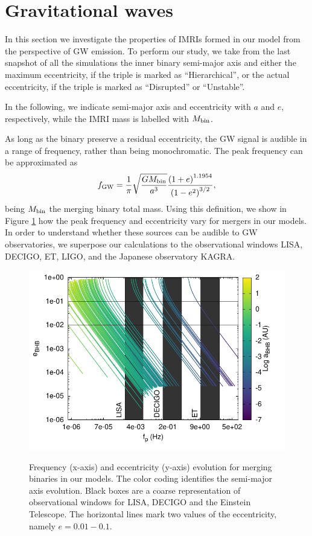 \documentclass[twocolumn]{aastex62}
\newcommand{\gw}{{\rm GW}}
\begin{document}
\section{Gravitational waves}

In this section we investigate the properties of IMRIs formed in our model from the perspective of GW emission. To perform our study, we take from the last snapshot of all the simulations the inner binary semi-major axis and either the maximum eccentricity, if the triple is marked as ``Hierarchical'', or the actual eccentricity, if the triple is marked as ``Disrupted'' or ``Unstable''.

In the following, we indicate semi-major axis and eccentricity with $a$ and $e$, respectively, while the IMRI mass is labelled with $M_{\rm bin}$.

As long as the binary preserve a residual eccentricity, the GW signal is audible in a range of frequency, rather than being monochromatic. The peak frequency can be approximated as \citep{wen03, antonini12}
\begin{equation}
f_\gw = \frac{1}{\pi}\sqrt{\frac{GM_{\rm bin}}{a^3}}\frac{\left(1+e\right)^{1.1954}}{\left(1-e^2\right)^{3/2}},
\end{equation}  
being $M_{\rm bin}$ the merging binary total mass. Using this definition, we show in Figure \ref{F10} how the peak frequency and eccentricity vary for mergers in our models. In order to understand whether these sources can be audible to GW observatories, we superpose our calculations to the observational windows LISA, DECIGO, ET, LIGO, and the Japanese observatory KAGRA.

\begin{figure}
\centering
\includegraphics[width=\columnwidth]{freq_evo}\\
\caption{Frequency (x-axis) and eccentricity (y-axis) evolution for merging binaries in our models. The color coding identifies the semi-major axis evolution. Black boxes are a coarse representation of observational windows for LISA, DECIGO and the Einstein Telescope. The horizontal lines mark two values of the eccentricity, namely $e=0.01-0.1$.}
\label{F10}
\end{figure}
\end{document}
